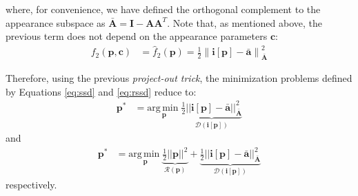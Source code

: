 where, for convenience, we have defined the orthogonal complement to the appearance subspace as $\bar{\mathbf{A}}= \mathbf{I} -\mathbf{A}\mathbf{A}^T$. Note that, as mentioned above, the previous term does not depend on the appearance parameters $\mathbf{c}$:
\begin{equation}
    \begin{aligned}
        f_2(\mathbf{p}, \mathbf{c}) & = \hat{f}_2(\mathbf{p}) = \frac{1}{2}\left\| \mathbf{i}[\mathbf{p}] - \bar{\mathbf{a}} \right\|_{\bar{\mathbf{A}}}^2
    \label{eq:po}
    \end{aligned}
\end{equation}

Therefore, using the previous \emph{project-out trick}, the minimization problems defined by Equations \ref{eq:ssd} and \ref{eq:rssd} reduce to:
\begin{equation}
    \begin{aligned}
        \mathbf{p}^* & = \underset{\mathbf{p}} {\mathrm{arg\, min\;}} \underbrace{\frac{1}{2}|| \mathbf{i}[\mathbf{p}] - \mathbf{\bar{a}} ||^2_{\bar{\mathbf{A}}}}_{\mathcal{D} (\mathbf{i}[\mathbf{p}])}
    \label{eq:po}
    \end{aligned}
\end{equation}
and
\begin{equation}
    \begin{aligned}
        \mathbf{p}^* & = \underset{\mathbf{p}} {\mathrm{arg\, min\;}} \underbrace{\frac{1}{2}||\mathbf{p}||^2}_{\mathcal{R} (\mathbf{p})} + \underbrace{\frac{1}{2}|| \mathbf{i}[\mathbf{p}] - \mathbf{\bar{a}} ||^2_{\bar{\mathbf{A}}}}_{\mathcal{D} (\mathbf{i}[\mathbf{p}])}
    \label{eq:rpo}
    \end{aligned}
\end{equation}
respectively.

